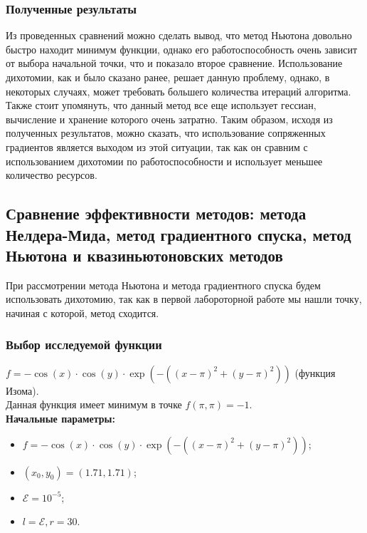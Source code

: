 \documentclass{article}
\begin{document}
\subsubsection*{Полученные результаты}
Из проведенных сравнений можно сделать вывод, что метод Ньютона довольно быстро находит минимум функции, однако его работоспособность очень зависит от выбора начальной точки, что и показало второе сравнение. Использование дихотомии, как и было сказано ранее, решает данную проблему, однако, в некоторых случаях, может требовать большего количества итераций алгоритма. Также стоит упомянуть, что данный метод все еще использует гессиан, вычисление и хранение которого очень затратно. Таким образом, исходя из полученных результатов, можно сказать, что использование сопряженных градиентов является выходом из этой ситуации, так как он сравним с использованием дихотомии по работоспособности и использует меньшее количество ресурсов.

\newpage
\subsection*{Сравнение эффективности методов: метода Нелдера-Мида, метод градиентного спуска, метод Ньютона и квазиньютоновских методов}

При рассмотрении метода Ньютона и метода градиентного спуска будем использовать дихотомию, так как в первой лабороторной работе мы нашли точку, начиная с которой, метод сходится.

\subsubsection*{Выбор исследуемой функции}
\noindent $f = -\cos(x) \cdot \cos(y) \cdot \exp(-((x - \pi)^2 + (y - \pi)^2))$ (функция Изома). \\

\noindent Данная функция имеет минимум в точке ${\displaystyle f(\pi ,\pi )=-1}$. \\

\noindent \textbf{Начальные параметры:}
\begin{itemize}
    \item $f = -\cos(x) \cdot \cos(y) \cdot \exp(-((x - \pi)^2 + (y - \pi)^2))$;
    \item $(x_0, y_0) = (1.71, 1.71)$;
    \item $\mathcal{E} = 10^{-5}$;
    \item $l = \mathcal{E}, r = 30$.
\end{itemize}
\end{document}
